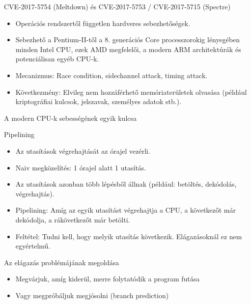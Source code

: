 \documentclass[12 pt]{beamer}
\begin{document}
\begin{frame}{CVE-2017-5754 (Meltdown) és CVE-2017-5753 / CVE-2017-5715 (Spectre)}
  \begin{itemize}
    \item{Operációs rendszertől független hardveres sebezhetőségek.}
    \item{Sebezhető a Pentium-II-től a 8. generációs Core processzorokig lényegében minden Intel CPU, ezek AMD megfelelői, a modern ARM architektúrák és potenciálisan egyéb CPU-k.}
    \item{Mecanizmus: Race condition, sidechannel attack, timing attack.}
    \item{Következmény: Elvileg nem hozzáférhető memóriaterületek olvasása (például kriptográfiai kulcsok, jelszavak, személyes adatok stb.).}
  \end{itemize}
\end{frame}

\begin{frame}{A modern CPU-k sebességének egyik kulcsa}
  \begin{block}{Pipelining}
    \begin{itemize}
      \item{Az utasítások végrehajtását az órajel vezérli.}
      \item{Naiv megközelítés: 1 órajel alatt 1 utasítás.}
      \item{Az utasítások azonban több lépésből állnak (például: betöltés, dekódolás, végrehajtás).}
      \item{Pipelining: Amíg az egyik utasítást végrehajtja a CPU, a következőt már dekódolja, a rákövetkezőt már betölti.}
      \item{Feltétel: Tudni kell, hogy melyik utasítás következik. Elágazásoknál ez nem egyértelmű.}
    \end{itemize}
  \end{block}

  \begin{block}{Az elágazás problémájának megoldása}
    \begin{itemize}
      \item{Megvárjuk, amíg kiderül, merre folytatódik a program futása}
      \item{Vagy megpróbáljuk megjósolni (branch prediction)}
    \end{itemize}
  \end{block}
\end{frame}
\end{document}
